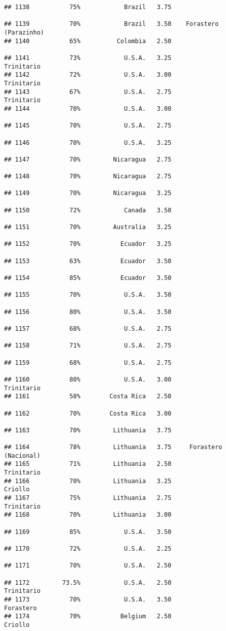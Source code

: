 \documentclass[
]{article}
\begin{document}
\begin{verbatim}
## 1138           75%            Brazil   3.75                         
## 1139           70%            Brazil   3.50    Forastero (Parazinho)
## 1140           65%          Colombia   2.50                         
## 1141           73%            U.S.A.   3.25               Trinitario
## 1142           72%            U.S.A.   3.00               Trinitario
## 1143           67%            U.S.A.   2.75               Trinitario
## 1144           70%            U.S.A.   3.00                         
## 1145           70%            U.S.A.   2.75                         
## 1146           70%            U.S.A.   3.25                         
## 1147           70%         Nicaragua   2.75                         
## 1148           70%         Nicaragua   2.75                         
## 1149           70%         Nicaragua   3.25                         
## 1150           72%            Canada   3.50                         
## 1151           70%         Australia   3.25                         
## 1152           70%           Ecuador   3.25                         
## 1153           63%           Ecuador   3.50                         
## 1154           85%           Ecuador   3.50                         
## 1155           70%            U.S.A.   3.50                         
## 1156           80%            U.S.A.   3.50                         
## 1157           68%            U.S.A.   2.75                         
## 1158           71%            U.S.A.   2.75                         
## 1159           68%            U.S.A.   2.75                         
## 1160           80%            U.S.A.   3.00               Trinitario
## 1161           58%        Costa Rica   2.50                         
## 1162           70%        Costa Rica   3.00                         
## 1163           70%         Lithuania   3.75                         
## 1164           78%         Lithuania   3.75     Forastero (Nacional)
## 1165           71%         Lithuania   2.50               Trinitario
## 1166           70%         Lithuania   3.25                  Criollo
## 1167           75%         Lithuania   2.75               Trinitario
## 1168           70%         Lithuania   3.00                         
## 1169           85%            U.S.A.   3.50                         
## 1170           72%            U.S.A.   2.25                         
## 1171           70%            U.S.A.   2.50                         
## 1172         73.5%            U.S.A.   2.50               Trinitario
## 1173           70%            U.S.A.   3.50                Forastero
## 1174           70%           Belgium   2.50                  Criollo

\end{verbatim}
\end{document}
